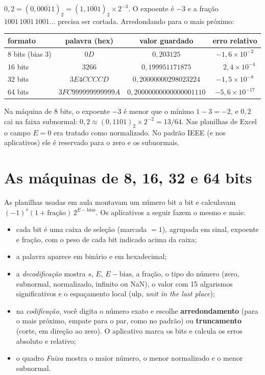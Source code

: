 \begin{exemplo}
$0{,}2=(0{,}0\overline{0011})_2=(1{,}\overline{1001})_2\times2^{-3}$. O expoente é $-3$ e a fração
$1001\,1001\,1001\dots$ precisa ser cortada. Arredondando para o mais próximo:

\begin{center}
\small
\begin{tabular}{lccc}
\toprule
formato & palavra (hex) & valor guardado & erro relativo\\
\midrule
8 bits (bias 3)   & $0D$          & $0{,}203125$ & $-1{,}6\times10^{-2}$\\
16 bits           & $3266$        & $0{,}199951171875$ & $\phantom{-}2{,}4\times10^{-4}$\\
32 bits           & $3E4CCCCD$    & $0{,}20000000298023224$ & $-1{,}5\times10^{-8}$\\
64 bits           & $3FC999999999999A$ & $0{,}20000000000000001110$ & $-5{,}6\times10^{-17}$\\
\bottomrule
\end{tabular}
\end{center}

Na máquina de 8 bits, o expoente $-3$ é menor que o mínimo $1-3=-2$, e $0{,}2$ cai na faixa
subnormal: $0{,}2\approx(0{,}1101)_2\times2^{-2}=13/64$. Nas planilhas de Excel o campo $E=0$ era tratado
como normalizado. No padrão IEEE (e nos aplicativos) ele é reservado para o zero e os subnormais.
\end{exemplo}



\section{As máquinas de 8, 16, 32 e 64 bits}

As planilhas usadas em aula montavam um número bit a bit e calculavam
$(-1)^s(1+\text{fração})\,2^{E-\text{bias}}$. Os aplicativos a seguir fazem o mesmo e mais:
\begin{itemize}[nosep]
  \item cada bit é uma caixa de seleção (marcada $=1$), agrupada em sinal, expoente e fração, com o
        peso de cada bit indicado acima da caixa;
  \item a palavra aparece em binário e em hexadecimal;
  \item a \emph{decodificação} mostra $s$, $E$, $E-\text{bias}$, a fração, o tipo do número (zero,
        subnormal, normalizado, infinito ou NaN), o valor com 15 algarismos significativos e o
        espaçamento local (ulp, \emph{unit in the last place});
  \item na \emph{codificação}, você digita o número exato e escolhe \textbf{arredondamento} (para o mais
        próximo, empate para o par, como no padrão) ou \textbf{truncamento} (corte, em direção ao zero).
        O aplicativo marca os bits e calcula os erros absoluto e relativo;
  \item o quadro \emph{Faixa} mostra o maior número, o menor normalizado e o menor subnormal.
\end{itemize}

